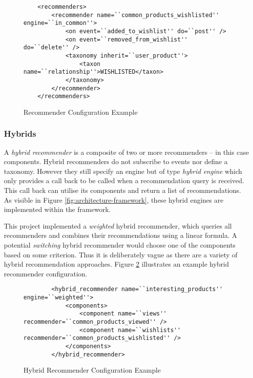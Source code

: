 \begin{figure}[ht]
    \begin{verbatim}
    <recommenders>
        <recommender name=``common_products_wishlisted'' engine=``in_common''>
            <on event=``added_to_wishlist'' do=``post'' />
            <on event=``removed_from_wishlist'' do=``delete'' />
            <taxonomy inherit=``user_product''>
                <taxon name=``relationship''>WISHLISTED</taxon>
            </taxonomy>
        </recommender>
    </recommenders>
    \end{verbatim}
    \caption{Recommender Configuration Example}
    \label{fig:architecture-framework-recommender}
\end{figure}

\subsubsection{Hybrids}

A \emph{hybrid recommender} is a composite of two or more recommenders -- in this case components. Hybrid recommenders do not subscribe to events nor define a taxonomy. However they still specify an engine but of type \emph{hybrid engine} which only provides a call back to be called when a recommendation query is received. This call back can utilise its components and return a list of recommendations. As visible in Figure \ref{fig:architecture-framework}, these hybrid engines are implemented within the framework.

This project implemented a \emph{weighted} hybrid recommender, which queries all recommenders and combines their recommendations using a linear formula. A potential \emph{switching} hybrid recommender would choose one of the components based on some criterion. Thus it is deliberately vague as there are a variety of hybrid recommendation approaches. Figure \ref{fig:architecture-framework-hybrid-recommender} illustrates an example hybrid recommender configuration.

\begin{figure}[ht]
    \begin{verbatim}
        <hybrid_recommender name=``interesting_products'' engine=``weighted''>
            <components>
                <component name=``views'' recommender=``common_products_viewed'' />
                <component name=``wishlists'' recommender=``common_products_wishlisted'' />
            </components>
        </hybrid_recommender>
    \end{verbatim}
    \caption{Hybrid Recommender Configuration Example}
    \label{fig:architecture-framework-hybrid-recommender}
\end{figure}

